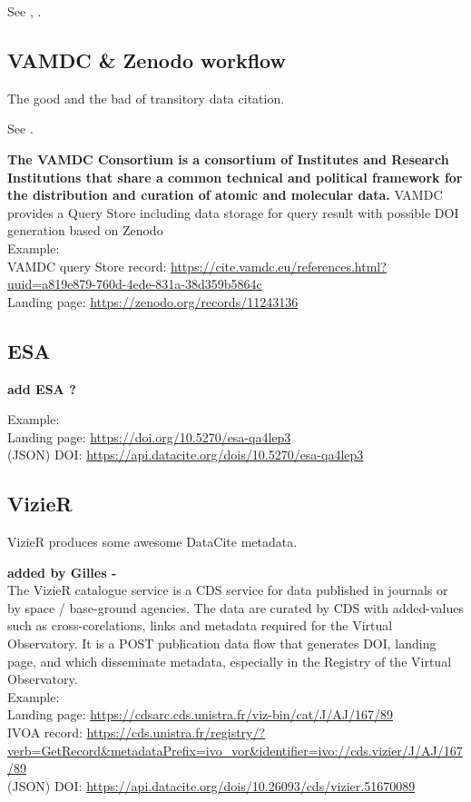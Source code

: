 \documentclass[11pt,a4paper]{ivoa}
\begin{document}
See \citep{2023ChNew..34....5D}, \citep{2018EPJWC.18612011R}.

	
\subsection{VAMDC \& Zenodo workflow}
The good and the bad of transitory data citation.

See \citep{2018Galax...6..105M}.

\textbf{\color{red} The VAMDC Consortium is a consortium of Institutes and Research Institutions that share a common technical and political framework for the distribution and curation of atomic and molecular data.}
{\color{red} 
VAMDC provides a Query Store including data storage for query result with possible DOI generation based on Zenodo}\\

Example:\\
VAMDC query Store record: \url{https://cite.vamdc.eu/references.html?uuid=a819e879-760d-4ede-831a-38d359b5864c}\\
Landing page: \url{https://zenodo.org/records/11243136}

\subsection{ESA}
\textbf{\color{red}  add ESA ?}

Example:\\
Landing page: \url{https://doi.org/10.5270/esa-qa4lep3}\\
(JSON) DOI: \url{https://api.datacite.org/dois/10.5270/esa-qa4lep3}

\subsection{VizieR}
VizieR produces some awesome DataCite metadata.


\textbf{\color{red} added by Gilles - }\\

The VizieR catalogue service is a CDS service for data published in journals or by space / base-ground agencies. The data are curated by CDS with added-values such as cross-corelations, links and metadata required for the Virtual Observatory. It is a POST publication data flow that generates DOI, landing page, and which disseminate metadata, especially in the Registry of the Virtual Observatory.\\


Example:\\
Landing page: \url{https://cdsarc.cds.unistra.fr/viz-bin/cat/J/AJ/167/89}\\
IVOA record: \url{https://cds.unistra.fr/registry/?verb=GetRecord&metadataPrefix=ivo_vor&identifier=ivo://cds.vizier/J/AJ/167/89}\\
(JSON) DOI: \url{https://api.datacite.org/dois/10.26093/cds/vizier.51670089}
\end{document}
